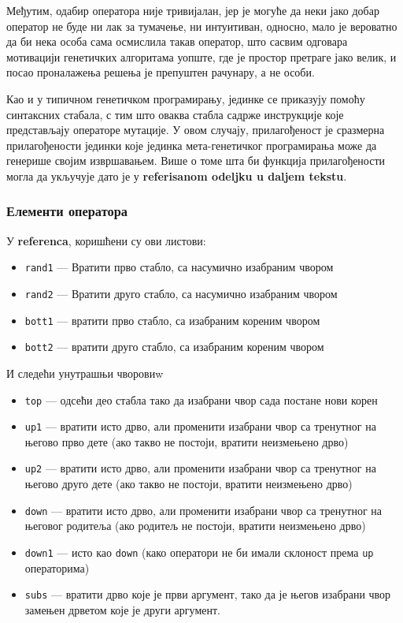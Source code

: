 \documentclass[a4paper]{article}
\begin{document}
Међутим, одабир оператора није тривијалан, јер је могуће да неки јако добар оператор не буде ни лак за тумачење, ни интуитиван, односно, мало је вероватно да би нека особа сама осмислила такав оператор, што сасвим одговара мотивацији генетичких алгоритама уопште, где је простор претраге јако велик, и посао проналажења решења је препуштен рачунару, а не особи.
\newline

Као и у типичном генетичком програмирању, јединке се приказују помоћу синтаксних стабала, с тим што оваква стабла садрже инструкције које представљају операторе мутације. У овом случају, прилагођеност је сразмерна прилагођености јединки које јединка мета-генетичког програмирања може да генерише својим извршавањем. Више о томе шта би функција прилагођености могла да укључује дато је у \textbf{referisanom odeljku u daljem tekstu}.
\newline

\subsubsection{Елементи оператора}
У \textbf{referenca}, коришћени су ови листови:
\begin{itemize}
\item \texttt{rand1} — Вратити прво стабло, са насумично изабраним чвором
\item \texttt{rand2} — Вратити друго стабло, са насумично изабраним чвором
\item \texttt{bott1} — вратити прво стабло, са изабраним кореним чвором
\item \texttt{bott2} — вратити друго стабло, са изабраним кореним чвором
\end{itemize}

И следећи унутрашњи чворовиw

\begin{itemize}
\item \texttt{top} — одсећи део стабла тако да изабрани чвор сада постане нови корен
\item \texttt{up1} — вратити исто дрво, али променити изабрани чвор са тренутног на његово прво дете (ако такво не постоји, вратити неизмењено дрво)
\item \texttt{up2} — вратити исто дрво, али променити изабрани чвор са тренутног на његово друго дете (ако такво не постоји, вратити неизмењено дрво)
\item \texttt{down} — вратити исто дрво, али променити изабрани чвор са тренутног на његовог родитеља (ако родитељ не постоји, вратити неизмењено дрво) 
\item \texttt{down1} — исто као \texttt{down} (како оператори не би имали склоност према \texttt{up} операторима)
\item \texttt{subs} — вратити дрво које је први аргумент, тако да је његов изабрани чвор замењен дрветом које је други аргумент.
\end{itemize}
\end{document}
